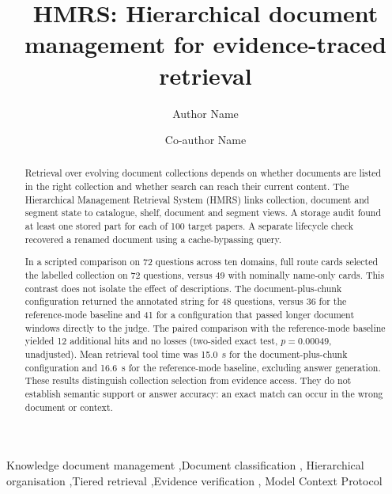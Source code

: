 \documentclass[review,12pt]{elsarticle}
\begin{document}
\begin{frontmatter}

\title{HMRS: Hierarchical document management for evidence-traced retrieval}

\author[inst1]{Author Name}
\author[inst1]{Co-author Name}

\begin{abstract}
Retrieval over evolving document collections depends on whether documents
are listed in the right collection and whether search can reach their
current content. The Hierarchical Management Retrieval System (HMRS) links
collection, document and segment state to catalogue, shelf, document and
segment views. A storage audit found at least one stored part for each of
100 target papers. A separate lifecycle check recovered a renamed document
using a cache-bypassing query.

In a scripted comparison on 72 questions across ten domains,
full route cards selected the labelled collection on 72 questions, versus
49 with nominally name-only cards. This contrast does not isolate the effect
of descriptions. The document-plus-chunk configuration returned the annotated
string for 48 questions, versus 36 for the reference-mode baseline and 41
for a configuration that passed longer document windows directly to the
judge. The paired comparison with the reference-mode baseline yielded 12
additional hits and no losses (two-sided exact test, $p=0.00049$, unadjusted).
Mean retrieval tool time was 15.0~s for the document-plus-chunk configuration
and 16.6~s for the reference-mode baseline, excluding answer generation.
These results distinguish collection selection from evidence access. They do not establish semantic support or answer accuracy: an exact
match can occur in the wrong document or context.
\end{abstract}

\begin{keyword}
Knowledge document management \sep Document classification \sep
Hierarchical organisation \sep Tiered retrieval \sep Evidence verification \sep
Model Context Protocol
\end{keyword}

\end{frontmatter}
















{\ifdefined\HMRSReviewLayout\else\footnotesize\fi
\ifdefined\HMRSReviewLayout
  \setlength{\bibsep}{0.5pt plus 0.2ex}
\else
  \setlength{\bibsep}{0pt}
\fi
{}


}
\end{document}
